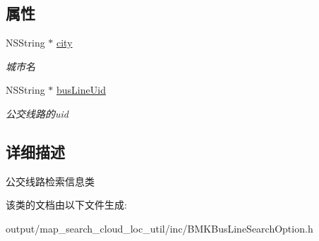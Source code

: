 \subsection*{属性}
\begin{DoxyCompactItemize}
\item 
\hypertarget{interface_b_m_k_bus_line_search_option_ac8dc465234c79e3882cddbd3e16ff21a}{N\+S\+String $\ast$ \hyperlink{interface_b_m_k_bus_line_search_option_ac8dc465234c79e3882cddbd3e16ff21a}{city}}\label{interface_b_m_k_bus_line_search_option_ac8dc465234c79e3882cddbd3e16ff21a}

\begin{DoxyCompactList}\small\item\em 城市名 \end{DoxyCompactList}\item 
\hypertarget{interface_b_m_k_bus_line_search_option_ac514e5b1930f97cecca6821562877146}{N\+S\+String $\ast$ \hyperlink{interface_b_m_k_bus_line_search_option_ac514e5b1930f97cecca6821562877146}{bus\+Line\+Uid}}\label{interface_b_m_k_bus_line_search_option_ac514e5b1930f97cecca6821562877146}

\begin{DoxyCompactList}\small\item\em 公交线路的uid \end{DoxyCompactList}\end{DoxyCompactItemize}


\subsection{详细描述}
公交线路检索信息类 

该类的文档由以下文件生成\+:\begin{DoxyCompactItemize}
\item 
output/map\+\_\+search\+\_\+cloud\+\_\+loc\+\_\+util/inc/B\+M\+K\+Bus\+Line\+Search\+Option.\+h\end{DoxyCompactItemize}
